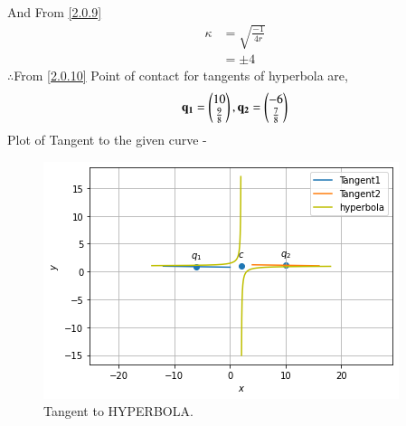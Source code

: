 \documentclass[journal,12pt,twocolumn]{IEEEtran}
\begin{document}
And From \eqref{2.0.9}
\begin{align}
\kappa &= \sqrt{\frac{-1}{4r}} \\
&=\pm 4
\end{align}
$\therefore$From \eqref{2.0.10} Point of contact for tangents of hyperbola are,
\begin{align}
  \mathbf{q_1}=\begin{pmatrix}10\\\frac{9}{8}\end{pmatrix},\mathbf{q_2}=\begin{pmatrix}-6\\\frac{7}{8}\end{pmatrix}
\end{align}
Plot of Tangent to the given curve -
\begin{figure}[!ht]
    \centering
    \includegraphics[width=\columnwidth]{HYPERBOLA.png}
    \caption{Tangent to HYPERBOLA.}
    \label{fig:Tangent to HYPERBOLA.}
\end{figure}  
\end{document}

